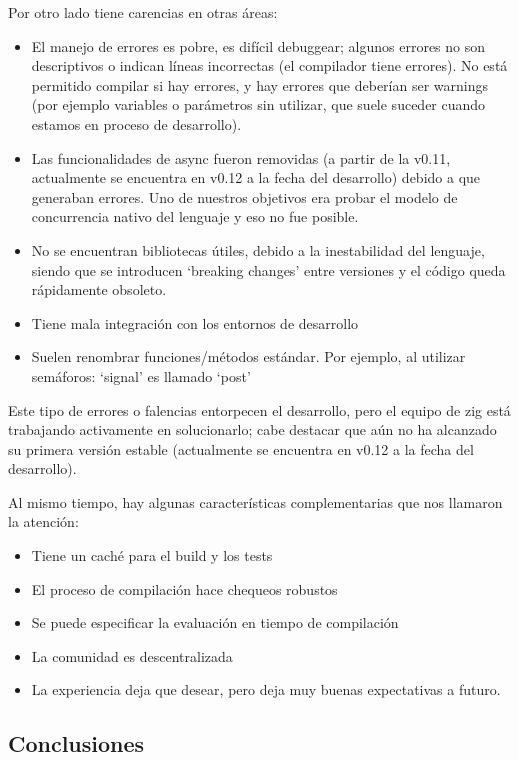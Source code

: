 \documentclass[11pt]{article}
\let\Oldsubsection\subsection
\renewcommand{\subsection}{\FloatBarrier\Oldsubsection}
\begin{document}
Por otro lado tiene carencias en otras áreas:

\begin{itemize}
    \item El manejo de errores es pobre, es difícil debuggear; algunos errores no son descriptivos o indican líneas incorrectas (el compilador tiene errores). No está permitido compilar si hay errores, y hay errores que deberían ser warnings (por ejemplo variables o parámetros sin utilizar, que suele suceder cuando estamos en proceso de desarrollo).
    \item Las funcionalidades de async fueron removidas (a partir de la v0.11, actualmente se encuentra en v0.12 a la fecha del desarrollo) debido a que generaban errores. Uno de nuestros objetivos era probar el modelo de concurrencia nativo del lenguaje y eso no fue posible.
    \item No se encuentran bibliotecas útiles, debido a la inestabilidad del lenguaje, siendo que se introducen ‘breaking changes’ entre versiones y el código queda rápidamente obsoleto.
    \item Tiene mala integración con los entornos de desarrollo
    \item Suelen renombrar funciones/métodos estándar. Por ejemplo, al utilizar semáforos: ‘signal’ es llamado ‘post’

\end{itemize}

Este tipo de errores o falencias entorpecen el desarrollo, pero el equipo de zig está trabajando activamente en solucionarlo; cabe destacar que aún no ha alcanzado su primera versión estable (actualmente se encuentra en v0.12 a la fecha del desarrollo).

Al mismo tiempo, hay algunas características complementarias que nos llamaron la atención:
\begin{itemize}
    \item Tiene un caché para el build y los tests
    \item El proceso de compilación hace chequeos robustos
    \item Se puede especificar la evaluación en tiempo de compilación
    \item La comunidad es descentralizada
    \item La experiencia deja que desear, pero deja muy buenas expectativas a futuro.
\end{itemize}

\subsection{Conclusiones}
\end{document}
